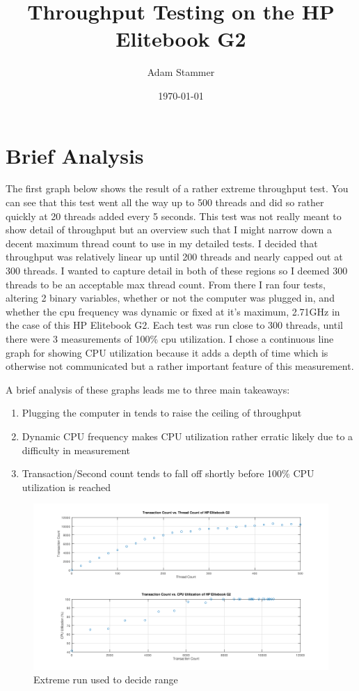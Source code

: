 \documentclass[prb,preprint]{revtex4-1}
\begin{document}
\title{Throughput Testing on the HP Elitebook G2}
\author{Adam Stammer}
\date{\today}

\maketitle
	
\section{Brief Analysis}

The first graph below shows the result of a rather extreme throughput test. You can see that this test went all the way up to 500 threads and did so rather quickly at 20 threads added every 5 seconds. This test was not really meant to show detail of throughput but an overview such that I might narrow down a decent maximum thread count to use in my detailed tests. I decided that throughput was relatively linear up until 200 threads and nearly capped out at 300 threads. I wanted to capture detail in both of these regions so I deemed 300 threads to be an acceptable max thread count.
\linebreak
From there I ran four tests, altering 2 binary variables, whether or not the computer was plugged in, and whether the cpu frequency was dynamic or fixed at it's maximum, 2.71GHz in the case of this HP Elitebook G2. Each test was run close to 300 threads, until there were 3 measurements of 100\% cpu utilization. I chose a continuous line graph for showing CPU utilization because it adds a depth of time which is otherwise not communicated but a rather important feature of this measurement.


A brief analysis of these graphs leads me to three main takeaways:
\begin{enumerate}
	\item Plugging the computer in tends to raise the ceiling of throughput
	\item Dynamic CPU frequency makes CPU utilization rather erratic likely due to a difficulty in measurement
	\item Transaction/Second count tends to fall off shortly before 100\% CPU utilization is reached
\end{enumerate}

\begin{figure}
	\centering
	\includegraphics[width=10in]{bigGraphInitial.png}
	\caption{Extreme run used to decide range}
	\label{fig1}
\end{figure}
\end{document}
